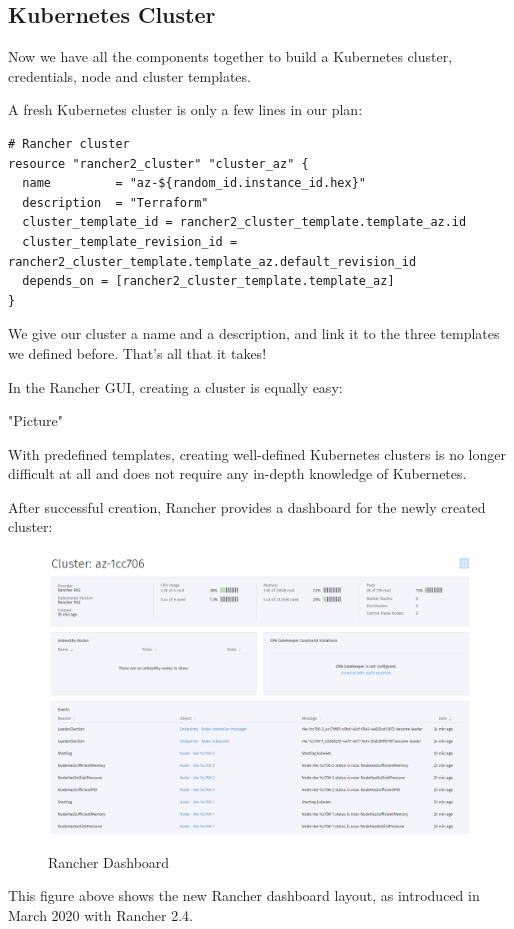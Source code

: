 \subsection{Kubernetes Cluster}

Now we have all the components together to build a Kubernetes cluster, credentials, node and cluster templates. 

A fresh Kubernetes cluster is only a few lines in our plan:

\begin{lstlisting}[caption=Kubernetes Cluster, frame=single, basicstyle=\ttfamily]
# Rancher cluster
resource "rancher2_cluster" "cluster_az" {
  name         = "az-${random_id.instance_id.hex}"
  description  = "Terraform"
  cluster_template_id = rancher2_cluster_template.template_az.id
  cluster_template_revision_id = rancher2_cluster_template.template_az.default_revision_id
  depends_on = [rancher2_cluster_template.template_az]
}
\end{lstlisting}

We give our cluster a name and a description, and link it to the three templates we defined before. That's all that it takes!

In the Rancher GUI, creating a cluster is equally easy:

"Picture"

With predefined templates, creating well-defined Kubernetes clusters is no longer difficult at all and does not require any in-depth knowledge of Kubernetes.

After successful creation, Rancher provides a dashboard for the newly created cluster:

\begin{figure}[H]
\centering
\caption {Rancher Dashboard}
\includegraphics[width=\linewidth]{images/cluster-dashboard-new.png}
\label{fig:clusterOverview}
\end{figure}

This figure above shows the new Rancher dashboard layout, as introduced in March 2020 with Rancher 2.4.
